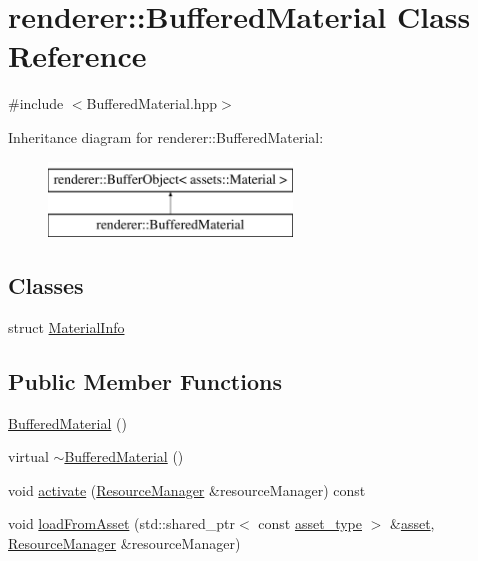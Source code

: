 \hypertarget{classrenderer_1_1BufferedMaterial}{\section{renderer\-:\-:Buffered\-Material Class Reference}
\label{classrenderer_1_1BufferedMaterial}
}


{\ttfamily \#include $<$Buffered\-Material.\-hpp$>$}

Inheritance diagram for renderer\-:\-:Buffered\-Material\-:\begin{figure}[H]
\begin{center}
\leavevmode
\includegraphics[height=2.000000cm]{classrenderer_1_1BufferedMaterial}
\end{center}
\end{figure}
\subsection*{Classes}
\begin{DoxyCompactItemize}
\item 
struct \hyperlink{structrenderer_1_1BufferedMaterial_1_1MaterialInfo}{Material\-Info}
\end{DoxyCompactItemize}
\subsection*{Public Member Functions}
\begin{DoxyCompactItemize}
\item 
\hyperlink{classrenderer_1_1BufferedMaterial_a2929bb000702b60bd4534f917fc0dc5b}{Buffered\-Material} ()
\item 
virtual \hyperlink{classrenderer_1_1BufferedMaterial_ac6675d2802726597c41c11ae894cfddd}{$\sim$\-Buffered\-Material} ()
\item 
void \hyperlink{classrenderer_1_1BufferedMaterial_a327f5fd6569d30f703038449d188f414}{activate} (\hyperlink{classrenderer_1_1ResourceManager}{Resource\-Manager} \&resource\-Manager) const 
\item 
void \hyperlink{classrenderer_1_1BufferedMaterial_a2b570e7e70635ea5d6b687a06ccc27d2}{load\-From\-Asset} (std\-::shared\-\_\-ptr$<$ const \hyperlink{classrenderer_1_1BufferObject_a651cbaff8aa7148d72a9eaf71ad3636e}{asset\-\_\-type} $>$ \&\hyperlink{classrenderer_1_1BufferObject_ad747c7e09a4acda6847b6fca9977eed6}{asset}, \hyperlink{classrenderer_1_1ResourceManager}{Resource\-Manager} \&resource\-Manager)
\end{DoxyCompactItemize}
